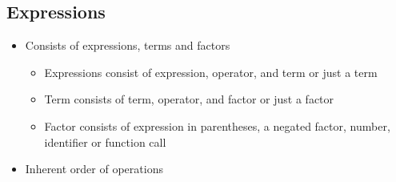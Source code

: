 \subsection{Expressions}
\begin{itemize}
    \item Consists of expressions, terms and factors
    \begin{itemize}
        \item Expressions consist of expression, operator, and term or just a term
        \item Term consists of term, operator, and factor or just a factor
        \item Factor consists of expression in parentheses, a negated factor, number, identifier or function call
    \end{itemize}
    \item Inherent order of operations
\end{itemize}